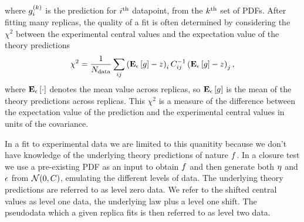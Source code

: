 where $g^{(k)}_i$ is the prediction for $i^{\rm th}$ datapoint, from
the $k^{\rm th}$ set of PDFs. After fitting many replicas, the quality of a fit is often determined by
considering the $\chi^2$ between the experimental central values and the
expectation value of the theory predictions
\begin{equation}\label{eq:centralchi2}
    \chi^2 = \frac{1}{N_{\rm data}} \sum_{ij} \left( \mathbf{E}_{\epsilon}\left[ g \right] - z \right)_i C^{-1}_{ij} \left( \mathbf{E}_{\epsilon}\left[ g \right] - z \right)_j,
\end{equation}
where $\mathbf{E}_{\epsilon}\left[ \cdot \right]$ denotes the mean value across replicas, so $\mathbf{E}_{\epsilon}\left[ g \right]$ is the mean
of the theory predictions across replicas. This $\chi^2$ is a
measure of the difference between the expectation value of the prediction and
the experimental central values in units of the covariance.

In a fit to
experimental data we are limited to this quanitity because we don't have knowledge
of the underlying theory predictions of nature $f$. In a closure test we use
a pre-existing PDF as an input to obtain $f$ and then generate both
$\eta$ and $\epsilon$ from $\mathcal{N}(0, C)$, emulating the different levels
of data. The underlying theory predictions are referred to as level zero data.
We refer to the shifted central values as level one data, the underlying
law plus a level one shift. The pseudodata which a given replica fits is then
referred to as level two data.

